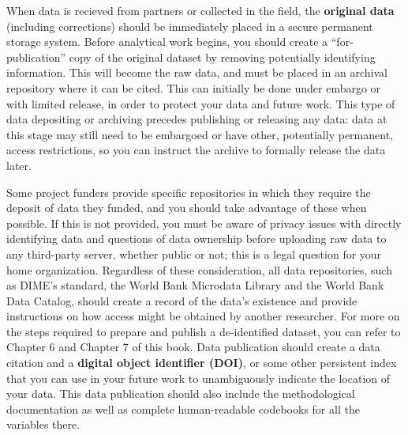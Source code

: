 When data is recieved from partners or collected in the field,
the \textbf{original data} (including corrections)
should be immediately placed in a secure permanent storage system.
Before analytical work begins, you should create a ``for-publication''
copy of the original dataset by removing potentially identifying information.
This will become the raw data, and must be
placed in an archival repository where it can be cited.\cite{vilhuber2020report}
This can initially be done under embargo or with limited release,
in order to protect your data and future work.
This type of data depositing or archiving
precedes publishing or releasing any data:
data at this stage may still need to be embargoed
or have other, potentially permanent, access restrictions,
so you can instruct the archive to formally release the data later.

Some project funders
provide specific repositories in which they require the deposit of data they funded,
and you should take advantage of these when possible.
If this is not provided, you must be aware of privacy issues
with directly identifying data and questions of data ownership
before uploading raw data to any third-party server, whether public or not;
this is a legal question for your home organization.
Regardless of these consideration, all data repositories,
such as DIME's standard, the World Bank Microdata Library
and the World Bank Data Catalog,
should create a record of the data's existence
and provide instructions on how access might be obtained by another researcher.
For more on the steps required to prepare and publish a de-identified dataset,
you can refer to Chapter 6 and Chapter 7 of this book.
Data publication should create a data citation and a \textbf{digital object identifier (DOI)},
or some other persistent index that you can use in your future work
to unambiguously indicate the location of your data.
This data publication should also include the methodological documentation
as well as complete human-readable codebooks for all the variables there.

